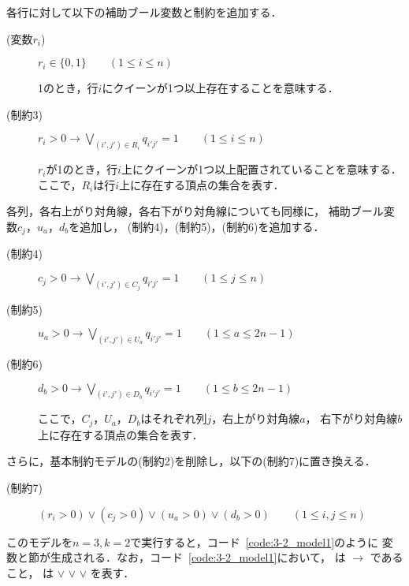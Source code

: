 各行に対して以下の補助ブール変数と制約を追加する．
\begin{description}
 \item[(変数$r_i$)] $r_{i} \in \{0,1\} \qquad (1 \leq i \leq n)$\par
  1のとき，行$i$にクイーンが1つ以上存在することを意味する．
 \item[(制約3)] $r_{i}>0 \rightarrow \bigvee\limits_{(i',j')\in R_{i}} q_{i'j'}=1 \qquad (1 \leq i \leq n)$ \par
  $r_{i}$が1のとき，行$i$上にクイーンが1つ以上配置されていることを意味する．
  ここで，$R_i$は行$i$上に存在する頂点の集合を表す．
\end{description}
%
各列，各右上がり対角線，各右下がり対角線についても同様に，
補助ブール変数$c_{j}$，$u_{a}$，$d_{b}$を追加し，
(制約4)，(制約5)，(制約6)を追加する．
%
\begin{description}
 \item[(制約4)] $c_{j}>0 \rightarrow \bigvee\limits_{(i',j')\in C_{j}} q_{i'j'}=1 \qquad (1 \leq j \leq n)$ 
 \item[(制約5)] $u_{a}>0 \rightarrow \bigvee\limits_{(i',j')\in U_{a}} q_{i'j'}=1 \qquad (1 \leq a \leq 2n-1)$ 
 \item[(制約6)] $d_{b}>0 \rightarrow \bigvee\limits_{(i',j')\in D_{b}} q_{i'j'}=1 \qquad (1 \leq b \leq 2n-1)$ \par
  ここで，$C_j$，$U_{a}$，$D_{b}$はそれぞれ列$j$，右上がり対角線$a$，
  右下がり対角線$b$上に存在する頂点の集合を表す．
\end{description}

さらに，基本制約モデルの(制約2)を削除し，以下の(制約7)に置き換える．
\begin{description}
 \item[(制約7)] $(r_i > 0) \vee (c_j >0) \vee (u_{a}>0) \vee (d_{b}>0) \qquad (1 \leq i,j \leq n)$
\end{description}

このモデルを$n=3,k=2$で実行すると，コード~\ref{code:3-2_model1}のように
変数と節が生成される．なお，コード~\ref{code:3-2_model1}において，
  
は $\rightarrow$ 
   
であること，  
 は $\vee$ 
 $\vee$  $\vee$ を表す．



